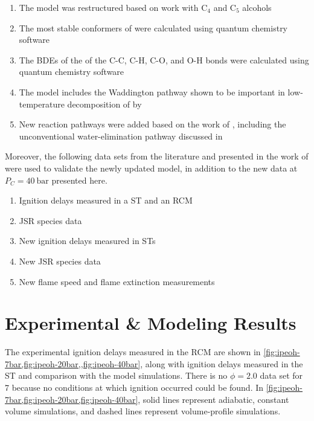 \documentclass[../main.tex]{subfiles}
\begin{document}
\begin{enumerate}
\item The model was restructured based on work with C$_4$ and C$_5$
      alcohols \cite{Sarathy2012, Heufer2012a}
\item The most stable conformers of \iPeOH{} were calculated using
      quantum chemistry software
\item The BDEs of the of the C-C, C-H, C-O, and O-H bonds were calculated
      using quantum chemistry software
\item The model includes the Waddington pathway shown to be important in
      low-temperature decomposition of \iPeOH{} by \textcite{Welz2012}
\item New reaction pathways were added based on the work of \textcite{Welz2012,
      Welz2013}, including the unconventional water-elimination pathway discussed
      in \textcite{Welz2013}
\end{enumerate}

Moreover, the following data sets from the literature and presented in
the work of \textcite{Sarathy2013} were used to validate the newly
updated model, in addition to the new data at $P_C=\SI{40}{\bar}$ presented here.

\begin{enumerate}
\item Ignition delays measured in a ST and an RCM\cite{Tang2013, Tsujimura2012}
\item JSR species data \cite{Dayma2011}
\item New ignition delays measured in STs \cite{Sarathy2013}
\item New JSR species data \cite{Sarathy2013}
\item New flame speed and flame extinction measurements \cite{Sarathy2013}
\end{enumerate}

\section{Experimental \& Modeling Results}
\label{sec:ipeoh-results}

The experimental ignition delays measured in the RCM are shown in
\cref{fig:ipeoh-7bar,fig:ipeoh-20bar,,fig:ipeoh-40bar}, along with
ignition delays measured in the ST and comparison with
the model simulations. There is no $\phi=2.0$ data set for \SI{7}{\atmosphere}
because no conditions at which ignition occurred could be found.
In \cref{fig:ipeoh-7bar,fig:ipeoh-20bar,fig:ipeoh-40bar}, solid
lines represent adiabatic, constant volume simulations, and dashed
lines represent volume-profile simulations.
\end{document}
